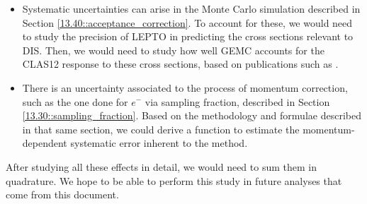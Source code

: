 \begin{itemize}
        \item
            Systematic uncertainties can arise in the Monte Carlo simulation described in Section \ref{13.40::acceptance_correction}.
            To account for these, we would need to study the precision of LEPTO in predicting the cross sections relevant to DIS.
            Then, we would need to study how well GEMC accounts for the CLAS12 response to these cross sections, based on publications such as \cite{ungaro2020gemc}.

        \item
            There is an uncertainty associated to the process of momentum correction, such as the one done for $e^-$ via sampling fraction, described in Section \ref{13.30::sampling_fraction}.
            Based on the methodology and formulae described in that same section, we could derive a function to estimate the momentum-dependent systematic error inherent to the method.
    \end{itemize}

    After studying all these effects in detail, we would need to sum them in quadrature.
    We hope to be able to perform this study in future analyses that come from this document.
